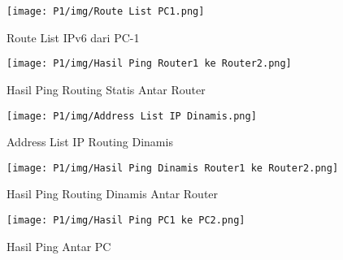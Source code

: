 \newpage

\begin{figure}[H]
    \centering
    \texttt{[image: P1/img/Route List PC1.png]}
    \caption{Route List IPv6 dari PC-1}
    \label{fig:crimping2_lampiran}
\end{figure}
\hfill

\begin{figure}[H]
    \centering
    \texttt{[image: P1/img/Hasil Ping Router1 ke Router2.png]}
    \caption{Hasil Ping Routing Statis Antar Router}
    \label{fig:crimping2_lampiran}
\end{figure}
\hfill

\begin{figure}[H]
    \centering
    \texttt{[image: P1/img/Address List IP Dinamis.png]}
    \caption{Address List IP Routing Dinamis}
    \label{fig:crimping2_lampiran}
\end{figure}

\begin{figure}[H]
    \centering
    \texttt{[image: P1/img/Hasil Ping Dinamis Router1 ke Router2.png]}
    \caption{Hasil Ping Routing Dinamis Antar Router}
    \label{fig:crimping2_lampiran}
\end{figure}

\begin{figure}[H]
    \centering
    \texttt{[image: P1/img/Hasil Ping PC1 ke PC2.png]}
    \caption{Hasil Ping Antar PC}
    \label{fig:crimping2_lampiran}
\end{figure}


